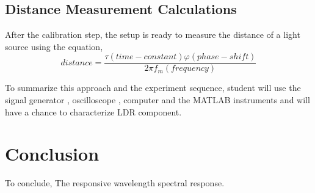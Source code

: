 \documentclass[letterpaper,12pt]{article}
\begin{document}
\subsection{Distance Measurement Calculations}
After the calibration step, the setup is ready to measure the distance of a light source using the equation,
\[distance = \frac{  \tau (time-constant)  \varphi (phase-shift)  }{2 \pi f_m (frequency)}\]

To summarize this approach and the experiment sequence, student will use the signal generator , oscilloscope , computer and the MATLAB instruments and will have a chance to characterize LDR component. 
\section{Conclusion}
To conclude,
The responsive wavelength spectral response.





\end{document}
